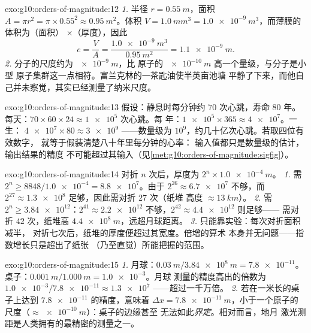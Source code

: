 \begin{solution}{exo:g10:orders-of-magnitude:12}
\emph{1.} 半径 $r = \qty{0.55}{m}$，面积
$A = \pi r^{2} = \pi \times 0.55^{2} \approx \qty{0.95}{m^2}$。体积
$V = \qty{1.0}{mm^3} = \qty{1.0e-9}{m^3}$，而薄膜的体积为（面积）
$\times$（厚度），因此
\[
e = \frac{V}{A} = \frac{\qty{1.0e-9}{m^3}}{\qty{0.95}{m^2}}
= \qty{1.1e-9}{m} .
\]
\emph{2.} 分子的尺度约为 $\qty{e-9}{m}$，比
原子的 $\qty{e-10}{m}$ 高一个量级，与分子是小型
原子集群这一点相符。富兰克林的一茶匙油使半英亩池塘
平静了下来，而他自己并未察觉，其实已经测量了纳米尺度。
\end{solution}

\begin{solution}{exo:g10:orders-of-magnitude:13}
假设：静息时每分钟约 $70$ 次心跳，寿命 $80$
年。每天：$70 \times 60 \times 24 \approx \num{1e5}$ 次心跳。每
年：$\num{1e5} \times 365 \approx \num{4e7}$。一生：
$\num{4e7} \times 80 \approx \num{3e9}$ ——数量级为
$10^{9}$，约几十亿次心跳。若取四位有效数字，
就等于假装清楚八十年里每分钟的心率：
输入值都只是数量级的估计，输出结果的精度
不可能超过其输入（见\cref{met:g10:orders-of-magnitude:sigfig}）。
\end{solution}

\begin{solution}{exo:g10:orders-of-magnitude:14}
对折 $n$ 次后，厚度为 $2^{n} \times \qty{1.0e-4}{m}$。
\emph{1.} 需 $2^{n} \geq 8848/\num{1.0e-4} = \num{8.8e7}$。由于
$2^{26} \approx \num{6.7e7}$ 不够，而
$2^{27} \approx \num{1.3e8}$ 足够，因此需对折 $27$ 次（纸堆
高度 $\approx \qty{13}{km}$）。
\emph{2.} 需 $2^{n} \geq \num{3.84e12}$：$2^{41} \approx
\num{2.2e12}$ 不够，$2^{42} \approx \num{4.4e12}$ 则足够——
需对折 $42$ 次，纸堆高 $\qty{4.4e8}{m}$，远超月球距离。
\emph{3.} 只能靠实验：每次对折面积减半，
对折七次后，纸堆的厚度便超过其宽度。倍增的算术
本身并无问题——指数增长只是超出了纸张
（乃至直觉）所能把握的范围。
\end{solution}

\begin{solution}{exo:g10:orders-of-magnitude:15}
\emph{1.} 月球：$\qty{0.03}{m}/\qty{3.84e8}{m} = \num{7.8e-11}$。
桌子：$\qty{0.001}{m}/\qty{1.000}{m} = \num{1.0e-3}$。月球
测量的精度高出的倍数为
$\num{1.0e-3}/\num{7.8e-11} \approx \num{1.3e7}$ ——超过一千万倍。
\emph{2.} 若在一米长的桌子上达到 $\num{7.8e-11}$ 的精度，意味着
$\Delta x = \qty{7.8e-11}{m}$，小于一个原子的
尺度（$\approx \qty{e-10}{m}$）：桌子的边缘甚至
无法如此\emph{界定}。相对而言，地月
激光测距是人类拥有的最精密的测量之一。
\end{solution}

